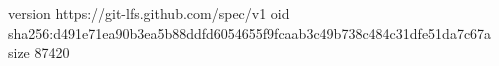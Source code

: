 version https://git-lfs.github.com/spec/v1
oid sha256:d491e71ea90b3ea5b88ddfd6054655f9fcaab3c49b738c484c31dfe51da7c67a
size 87420
